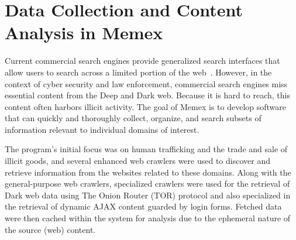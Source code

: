 \section{Data Collection and Content Analysis in Memex}
\label{sec:memex-data}
Current commercial search engines provide generalized search interfaces that allow users to search across a limited portion of the web~\cite{fbo-memex}. However, in the context of cyber security and law enforcement, commercial search engines miss essential content from the Deep and Dark web. Because it is hard to reach, this content often harbors illicit activity. The goal of Memex is to develop software that can quickly and thoroughly collect, organize, and search subsets of information relevant to individual domains of interest. 

The program's initial focus was on human trafficking and the trade and sale of illicit goods, and several enhanced web crawlers were used to discover and retrieve information from the websites related to these domains. Along with the general-purpose web crawlers, specialized crawlers were used for the retrieval of Dark web data using The Onion Router (TOR) protocol \cite{mentor2016onion} and also specialized in the retrieval of dynamic AJAX content guarded by login forms. Fetched data were then cached within the system for analysis due to the ephemeral nature of the source (web) content.

